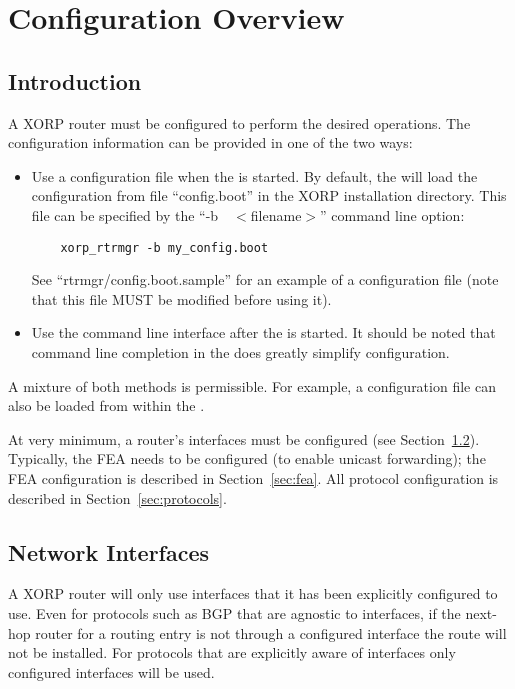 %
%

\chapter{Configuration Overview}
\section{Introduction}

A XORP router must be configured to perform the desired operations.
The configuration information can be provided in one of the two ways:

\begin{itemize}
\item
  Use a configuration file when the \rtrmgr is started.
  By default, the \rtrmgr will load the configuration from file
  ``config.boot'' in the XORP installation directory.
  This file can be specified by the ``-b~~$<$filename$>$'' command line
  option:
\begin{verbatim}
    xorp_rtrmgr -b my_config.boot
\end{verbatim}

    See ``rtrmgr/config.boot.sample'' for an example of a
    configuration file (note that this file MUST be modified
    before using it).

\item
  Use the \xorpsh command line interface after the \rtrmgr is started.
  It should be noted that command line completion in the \xorpsh
  does greatly simplify configuration.
\end{itemize}

\noindent
A mixture of both methods is permissible. For example,
a configuration file can also be loaded from within the \xorpsh.

At very minimum, a router's interfaces must be configured (see
Section~\ref{sec:network_interfaces}). Typically, the FEA needs to be
configured (\eg to enable unicast forwarding); the FEA configuration is
described in Section~\ref{sec:fea}. All protocol configuration is
described in Section~\ref{sec:protocols}.

\section{Network Interfaces}
\label{sec:network_interfaces}

A XORP router will only use interfaces that it has been explicitly
configured to use. Even for protocols such as BGP that are agnostic to
interfaces, if the next-hop router for a routing entry is not through
a configured interface the route will not be installed. For protocols
that are explicitly aware of interfaces only configured interfaces
will be used.


